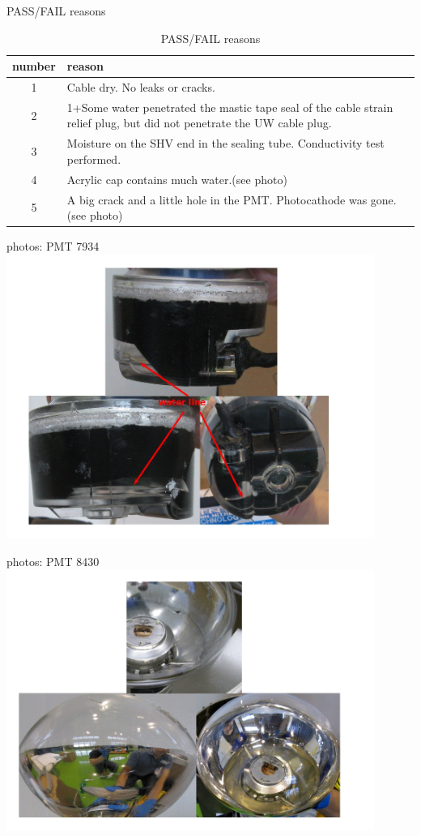 \documentclass{beamer}
\begin{document}
\begin{frame}{PASS/FAIL reasons}
	\setlength{\tabcolsep}{2pt}
	\small
	\begin{table}
		\begin{tabular}{|c|p{3.5in}|}
		\hline
		\textbf{number} & \textbf{reason} \\
		\hline
		\hline
		1 & Cable dry. No leaks or cracks. \\
		\hline
		2 & 1+Some water penetrated the mastic tape seal of the cable strain relief plug,
			but did not penetrate the UW cable plug. \\
		\hline
		3 & Moisture on the SHV end in the sealing tube. Conductivity test performed. \\
		\hline
		4 & Acrylic cap contains much water.(see photo) \\
		\hline
		5 & A big crack and a little hole in the PMT. Photocathode was gone.(see photo) \\
		\hline
		\end{tabular}
	\caption{PASS/FAIL reasons}
	\end{table}
\end{frame}

\begin{frame}{photos: PMT 7934}
\includegraphics[width=12cm]{PMT7934.jpg}
\end{frame}


\begin{frame}{photos: PMT 8430}
\includegraphics[width=12cm]{PMT8430.jpg}
\end{frame}
\end{document}
